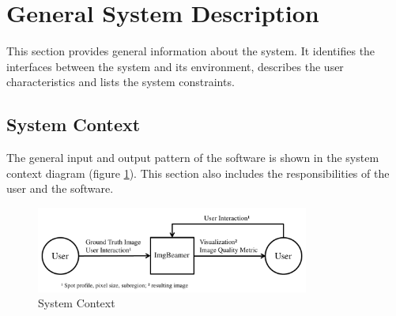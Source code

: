 \documentclass[12pt]{article}
\begin{document}
\section{General System Description}

This section provides general information about the system.  It identifies the
interfaces between the system and its environment, describes the user
characteristics and lists the system constraints.

\subsection{System Context}

The general input and output pattern of the \progname{} software is shown in the 
system context diagram (figure \ref{Fig_SystemContext}). This section also 
includes the responsibilities of the user and the software.

\setlength{\belowcaptionskip}{-30pt}
\begin{figure}[h!]
\begin{center}
 \includegraphics[width=0.8\textwidth]{SystemContextFigure}
\caption{System Context}
\label{Fig_SystemContext} 
\end{center}
\end{figure}
\setlength{\belowcaptionskip}{10pt}
\end{document}
